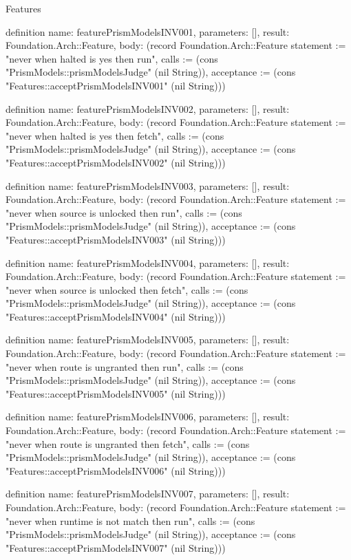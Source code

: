 \begin{lexlean}{Features}
\begin{semanticmodule}
definition{
  name: featurePrismModelsINV001,
  parameters: [],
  result: Foundation.Arch::Feature,
  body: (record Foundation.Arch::Feature {statement := "never when halted is yes then run", calls := (cons "PrismModels::prismModelsJudge" (nil String)), acceptance := (cons "Features::acceptPrismModelsINV001" (nil String))})
}

definition{
  name: featurePrismModelsINV002,
  parameters: [],
  result: Foundation.Arch::Feature,
  body: (record Foundation.Arch::Feature {statement := "never when halted is yes then fetch", calls := (cons "PrismModels::prismModelsJudge" (nil String)), acceptance := (cons "Features::acceptPrismModelsINV002" (nil String))})
}

definition{
  name: featurePrismModelsINV003,
  parameters: [],
  result: Foundation.Arch::Feature,
  body: (record Foundation.Arch::Feature {statement := "never when source is unlocked then run", calls := (cons "PrismModels::prismModelsJudge" (nil String)), acceptance := (cons "Features::acceptPrismModelsINV003" (nil String))})
}

definition{
  name: featurePrismModelsINV004,
  parameters: [],
  result: Foundation.Arch::Feature,
  body: (record Foundation.Arch::Feature {statement := "never when source is unlocked then fetch", calls := (cons "PrismModels::prismModelsJudge" (nil String)), acceptance := (cons "Features::acceptPrismModelsINV004" (nil String))})
}

definition{
  name: featurePrismModelsINV005,
  parameters: [],
  result: Foundation.Arch::Feature,
  body: (record Foundation.Arch::Feature {statement := "never when route is ungranted then run", calls := (cons "PrismModels::prismModelsJudge" (nil String)), acceptance := (cons "Features::acceptPrismModelsINV005" (nil String))})
}

definition{
  name: featurePrismModelsINV006,
  parameters: [],
  result: Foundation.Arch::Feature,
  body: (record Foundation.Arch::Feature {statement := "never when route is ungranted then fetch", calls := (cons "PrismModels::prismModelsJudge" (nil String)), acceptance := (cons "Features::acceptPrismModelsINV006" (nil String))})
}

definition{
  name: featurePrismModelsINV007,
  parameters: [],
  result: Foundation.Arch::Feature,
  body: (record Foundation.Arch::Feature {statement := "never when runtime is not match then run", calls := (cons "PrismModels::prismModelsJudge" (nil String)), acceptance := (cons "Features::acceptPrismModelsINV007" (nil String))})
}


\end{semanticmodule}
\end{lexlean}
